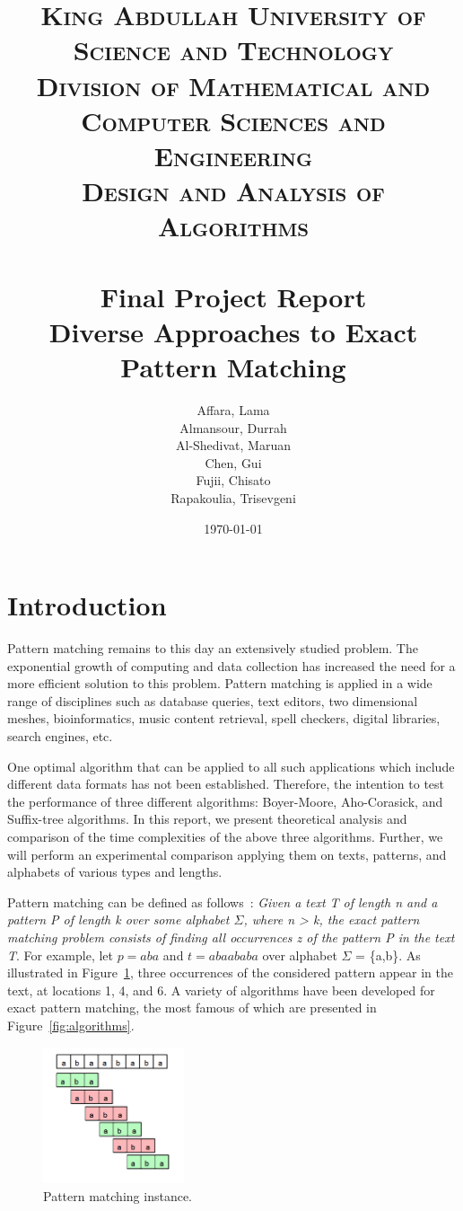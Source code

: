 \documentclass[paper=a4, fontsize=11pt]{scrartcl} %
\title{
\normalfont \normalsize
\textsc{King Abdullah University of Science and Technology\\
        Division of Mathematical and Computer Sciences and Engineering\\
        Design and Analysis of Algorithms} \\ [25pt] %
\horrule{0.5pt} \\[0.4cm] %
\huge Final Project Report\\
\huge Diverse Approaches to Exact Pattern Matching
\horrule{2pt} \\[0.5cm] %
}
\author{Affara, Lama\\
        Almansour, Durrah\\
        Al-Shedivat, Maruan\\
        Chen, Gui\\
        Fujii, Chisato\\
        Rapakoulia, Trisevgeni}
\date{}
\numberwithin{equation}{section} %
\numberwithin{figure}{section} %
\numberwithin{table}{section} %
\begin{document}
\begin{titlepage}
\maketitle
\vspace{\fill}
\centering
\date{\Large\today}
\thispagestyle{empty}
\end{titlepage}

\section{Introduction}
Pattern matching remains to this day an extensively studied problem. The exponential growth of computing and data collection has increased the need for a more efficient solution to this problem. Pattern matching is applied in a wide range of disciplines such as database queries, text editors, two dimensional meshes, bioinformatics, music content retrieval, spell checkers, digital libraries, search engines, etc.

One optimal algorithm that can be applied to all such applications which include different data formats has not been established. Therefore, the intention to test the performance of three different algorithms: Boyer-Moore, Aho-Corasick, and Suffix-tree algorithms. In this report, we present theoretical analysis and comparison of the time complexities of the above three algorithms. Further, we will perform an experimental comparison applying them on texts, patterns, and alphabets of various types and lengths.

Pattern matching can be defined as follows~\cite{intro}: \textit{Given a text T of length n and a pattern P of length k over some alphabet $\Sigma$, where n > k, the exact pattern matching problem consists of finding all occurrences z of the pattern P in the text T}. For example, let $p = aba$ and $t = abaababa$ over alphabet $\Sigma$ = \{a,b\}. As illustrated in Figure~\ref{fig:matching}, three occurrences of the considered pattern appear in the text, at locations 1, 4, and 6. A variety of algorithms have been developed for exact pattern matching, the most famous of which are presented in Figure~\ref{fig:algorithms}.

\begin{figure}[h!]
\centering
\includegraphics[width=0.37\textwidth]{figures/matching.png}
\caption{Pattern matching instance.}
\label{fig:matching}
\end{figure}
\end{document}
